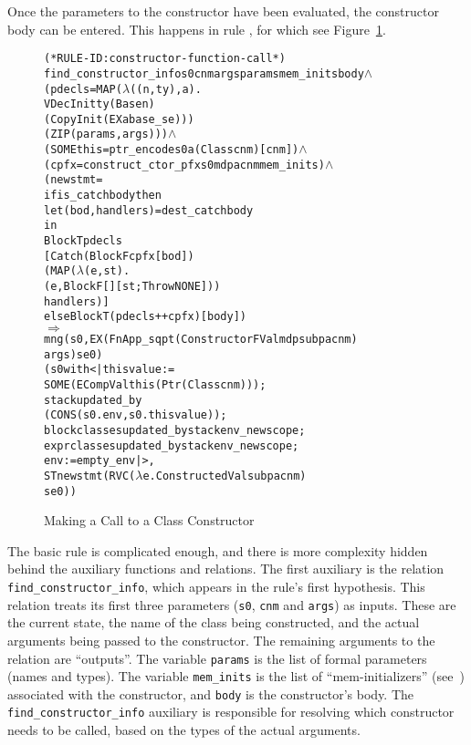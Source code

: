 \documentclass[11pt]{article}
\begin{document}
Once the parameters to the constructor have been evaluated, the
constructor body can be entered.  This happens in rule
, for which see
Figure~\ref{fig:constructor-function-call}.
\begin{figure}[htbp]
\begin{center}
\begin{minipage}{\textwidth}
%
\begin{alltt}
(* RULE-ID: constructor-function-call *)
     find_constructor_info s0 cnm args params mem_inits body \(\land\)
     (pdecls = MAP (\(\lambda\)((n,ty),a).
                        VDecInit ty (Base n)
                                    (CopyInit (EX a base_se)))
                   (ZIP (params, args))) \(\land\)
     (SOME this = ptr_encode s0 a (Class cnm) [cnm]) \(\land\)
     (cpfx = construct_ctor_pfx s0 mdp a cnm mem_inits) \(\land\)
     (newstmt =
        if is_catch body then
          let (bod,handlers) = dest_catch body
          in
            Block T pdecls
              [Catch (Block F cpfx [bod])
                     (MAP (\(\lambda\)(e,st).
                             (e, Block F [] [st; Throw NONE]))
                          handlers)]
        else Block T (pdecls ++ cpfx) [body])
   \(\Rightarrow\)
     mng (s0, EX (FnApp_sqpt (ConstructorFVal mdp subp a cnm)
                             args) se0)
         (s0 with <| thisvalue :=
                       SOME (ECompVal this (Ptr (Class cnm)));
                     stack updated_by
                       (CONS (s0.env, s0.thisvalue));
                     blockclasses updated_by stackenv_newscope;
                     exprclasses updated_by stackenv_newscope;
                     env := empty_env |>,
          ST newstmt (RVC (\(\lambda\)e. ConstructedVal subp a cnm)
                          se0))
\end{alltt}
    \end{minipage}
  \end{center}

  \caption{Making a Call to a Class Constructor}
\label{fig:constructor-function-call}
\end{figure}
The basic rule is complicated enough, and there is more complexity
hidden behind the auxiliary functions and relations.  The first
auxiliary is the relation \texttt{find_constructor_info}, which
appears in the rule's first hypothesis.  This relation treats its
first three parameters (\texttt{s0}, \texttt{cnm} and \texttt{args})
as inputs.  These are the current state, the name of the class being
constructed, and the actual arguments being passed to the constructor.
The remaining arguments to the relation are ``outputs''.  The variable
\texttt{params} is the list of formal parameters (names and types).
The variable \texttt{mem_inits} is the list of ``mem-initializers''
(see~\cite[\S12.6.2]{cpp-standard-iso14882}) associated with the
constructor, and \texttt{body} is the constructor's body.  The
\texttt{find_constructor_info} auxiliary is responsible for resolving
which constructor needs to be called, based on the types of the actual
arguments.
\end{document}

